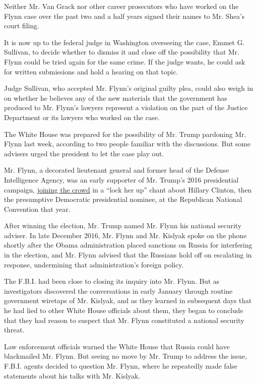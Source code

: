 Neither Mr. Van Grack nor other career prosecutors who have worked on
the Flynn case over the past two and a half years signed their names to
Mr. Shea's court filing.

It is now up to the federal judge in Washington overseeing the case,
Emmet G. Sullivan, to decide whether to dismiss it and close off the
possibility that Mr. Flynn could be tried again for the same crime. If
the judge wants, he could ask for written submissions and hold a hearing
on that topic.

Judge Sullivan, who accepted Mr. Flynn's original guilty plea, could
also weigh in on whether he believes any of the new materials that the
government has produced to Mr. Flynn's lawyers represent a violation on
the part of the Justice Department or its lawyers who worked on the
case.

The White House was prepared for the possibility of Mr. Trump pardoning
Mr. Flynn last week, according to two people familiar with the
discussions. But some advisers urged the president to let the case play
out.

Mr. Flynn, a decorated lieutenant general and former head of the Defense
Intelligence Agency, was an early supporter of Mr. Trump's 2016
presidential campaign,
\href{https://www.youtube.com/watch?v=UFBAjhxjQ90}{joining the crowd} in
a ``lock her up'' chant about Hillary Clinton, then the presumptive
Democratic presidential nominee, at the Republican National Convention
that year.

After winning the election, Mr. Trump named Mr. Flynn his national
security adviser. In late December 2016, Mr. Flynn and Mr. Kislyak spoke
on the phone shortly after the Obama administration placed sanctions on
Russia for interfering in the election, and Mr. Flynn advised that the
Russians hold off on escalating in response, undermining that
administration's foreign policy.

The F.B.I. had been close to closing its inquiry into Mr. Flynn. But as
investigators discovered the conversations in early January through
routine government wiretaps of Mr. Kislyak, and as they learned in
subsequent days that he had lied to other White House officials about
them, they began to conclude that they had reason to suspect that Mr.
Flynn constituted a national security threat.

Law enforcement officials warned the White House that Russia could have
blackmailed Mr. Flynn. But seeing no move by Mr. Trump to address the
issue, F.B.I. agents decided to question Mr. Flynn, where he repeatedly
made false statements about his talks with Mr. Kislyak.

